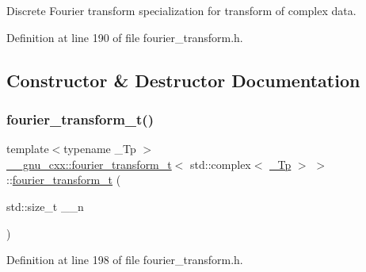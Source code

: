 Discrete Fourier transform specialization for transform of complex data. 

Definition at line 190 of file fourier\+\_\+transform.\+h.



\subsection{Constructor \& Destructor Documentation}
\mbox{\label{class____gnu__cxx_1_1fourier__transform__t_3_01std_1_1complex_3_01__Tp_01_4_01_4_a215f06e5944b3666d4bd737154625317}} 
\subsubsection{\texorpdfstring{fourier\+\_\+transform\+\_\+t()}{fourier\_transform\_t()}\hspace{0.1cm}{\footnotesize\ttfamily [1/2]}}
{\footnotesize\ttfamily template$<$typename \+\_\+\+Tp $>$ \\
\hyperlink{class____gnu__cxx_1_1fourier__transform__t}{\+\_\+\+\_\+gnu\+\_\+cxx\+::fourier\+\_\+transform\+\_\+t}$<$ std\+::complex$<$ \hyperlink{namespace____gnu__cxx_a3b19a9c800ca194374ef9172290f7d79}{\+\_\+\+Tp} $>$ $>$\+::\hyperlink{class____gnu__cxx_1_1fourier__transform__t}{fourier\+\_\+transform\+\_\+t} (\begin{DoxyParamCaption}\item[{std\+::size\+\_\+t}]{\+\_\+\+\_\+n }\end{DoxyParamCaption})\hspace{0.3cm}{\ttfamily [inline]}}



Definition at line 198 of file fourier\+\_\+transform.\+h.


